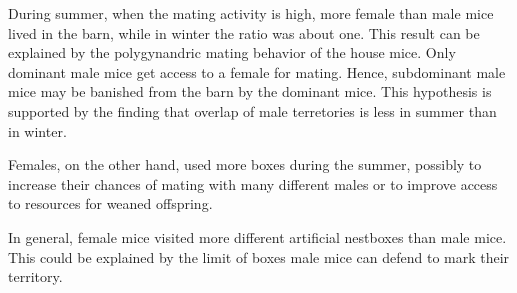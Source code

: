 During summer, when the mating activity is high, more female than male mice lived in the barn, while in winter the ratio was about one. This result can be explained by the polygynandric mating behavior of the house mice. Only dominant male mice get access to a female for mating. Hence, subdominant male mice may be banished from the barn by the dominant mice. This hypothesis is supported by the finding that overlap of male terretories is less in summer than in winter. 
 
Females, on the other hand, used more boxes during the summer, possibly to increase their chances of mating with many different males or to improve access to resources for weaned offspring.
 
In general, female mice visited more different artificial nestboxes than male mice. This could be explained by the limit of boxes male mice can defend to mark their territory.